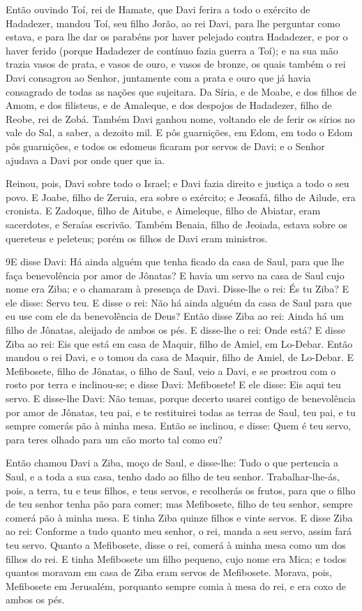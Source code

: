 Então ouvindo Toí, rei de Hamate, que Davi ferira a todo o
exército de Hadadezer, mandou Toí, seu filho Jorão, ao rei
Davi, para lhe perguntar como estava, e para lhe dar os parabéns por
haver pelejado contra Hadadezer, e por o haver ferido (porque
Hadadezer de contínuo fazia guerra a Toí); e na sua mão trazia vasos
de prata, e vasos de ouro, e vasos de bronze, os quais também
o rei Davi consagrou ao Senhor, juntamente com a prata e ouro que já
havia consagrado de todas as nações que sujeitara. Da Síria,
e de Moabe, e dos filhos de Amom, e dos filisteus, e de Amaleque, e
dos despojos de Hadadezer, filho de Reobe, rei de Zobá.
Também Davi ganhou nome, voltando ele de ferir os sírios no
vale do Sal, a saber, a dezoito mil. E pôs guarnições, em
Edom, em todo o Edom pôs guarnições, e todos os edomeus ficaram por
servos de Davi; e o Senhor ajudava a Davi por onde quer que ia.

Reinou, pois, Davi sobre todo o Israel; e Davi fazia direito e
justiça a todo o seu povo. E Joabe, filho de Zeruia, era
sobre o exército; e Jeosafá, filho de Ailude, era cronista. E
Zadoque, filho de Aitube, e Aimeleque, filho de Abiatar, eram
sacerdotes, e Seraías escrivão. Também Benaia, filho de
Jeoiada, estava sobre os quereteus e peleteus; porém os filhos de
Davi eram ministros.

\medskip

\lettrine{9} E disse Davi: Há ainda alguém que tenha ficado da
casa de Saul, para que lhe faça benevolência por amor de Jônatas?
E havia um servo na casa de Saul cujo nome era Ziba; e o
chamaram à presença de Davi. Disse-lhe o rei: És tu Ziba? E ele
disse: Servo teu. E disse o rei: Não há ainda alguém da casa de
Saul para que eu use com ele da benevolência de Deus? Então disse
Ziba ao rei: Ainda há um filho de Jônatas, aleijado de ambos os pés.
E disse-lhe o rei: Onde está? E disse Ziba ao rei: Eis que está
em casa de Maquir, filho de Amiel, em Lo-Debar. Então mandou o
rei Davi, e o tomou da casa de Maquir, filho de Amiel, de Lo-Debar.
E Mefibosete, filho de Jônatas, o filho de Saul, veio a Davi, e
se prostrou com o rosto por terra e inclinou-se; e disse Davi:
Mefibosete! E ele disse: Eis aqui teu servo. E disse-lhe Davi:
Não temas, porque decerto usarei contigo de benevolência por amor de
Jônatas, teu pai, e te restituirei todas as terras de Saul, teu pai,
e tu sempre comerás pão à minha mesa. Então se inclinou, e
disse: Quem é teu servo, para teres olhado para um cão morto tal
como eu?

Então chamou Davi a Ziba, moço de Saul, e disse-lhe: Tudo o que
pertencia a Saul, e a toda a sua casa, tenho dado ao filho de teu
senhor. Trabalhar-lhe-ás, pois, a terra, tu e teus filhos, e
teus servos, e recolherás os frutos, para que o filho de teu senhor
tenha pão para comer; mas Mefibosete, filho de teu senhor, sempre
comerá pão à minha mesa. E tinha Ziba quinze filhos e vinte servos.
E disse Ziba ao rei: Conforme a tudo quanto meu senhor, o
rei, manda a seu servo, assim fará teu servo. Quanto a Mefibosete,
disse o rei, comerá à minha mesa como um dos filhos do rei. E
tinha Mefibosete um filho pequeno, cujo nome era Mica; e todos
quantos moravam em casa de Ziba eram servos de Mefibosete.
Morava, pois, Mefibosete em Jerusalém, porquanto sempre comia
à mesa do rei, e era coxo de ambos os pés.

